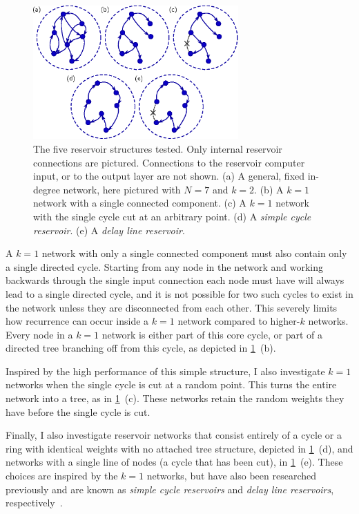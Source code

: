 \begin{figure}
  \includegraphics[width=0.7\textwidth]{figures/topology}
  \caption{The five reservoir structures tested. Only internal
    reservoir connections are pictured. Connections to the reservoir
    computer input, or to the output layer are not shown. (a) A
    general, fixed in-degree network, here pictured with $N=7$ and
    $k=2$. (b) A $k=1$ network with a single connected component. (c)
    A $k=1$ network with the single cycle cut at an arbitrary
    point. (d) A \emph{simple cycle reservoir}. (e) A \emph{delay line
      reservoir}.}%
  \label{fig:topology}
\end{figure}

A $k = 1$ network with only a single connected component must also
contain only a single directed cycle. Starting from any node in the
network and working backwards through the single input connection each
node must have will always lead to a single directed cycle, and it is
not possible for two such cycles to exist in the network unless they
are disconnected from each other. This severely limits how recurrence
can occur inside a $k = 1$ network compared to higher-$k$
networks. Every node in a $k = 1$ network is either part of this core
cycle, or part of a directed tree branching off from this cycle, as
depicted in \cref{fig:topology}~(b).

Inspired by the high performance of this simple structure, I also
investigate $k = 1$ networks when the single cycle is cut at a random
point. This turns the entire network into a tree, as in
\cref{fig:topology}~(c). These networks retain the random weights they
have before the single cycle is cut.

Finally, I also investigate reservoir networks that consist entirely
of a cycle or a ring with identical weights with no attached tree
structure, depicted in \cref{fig:topology}~(d), and networks with a
single line of nodes (a cycle that has been cut), in
\cref{fig:topology}~(e). These choices are inspired by the $k = 1$
networks, but have also been researched previously and are known as
\emph{simple cycle reservoirs} and \emph{delay line reservoirs},
respectively~\cite{rodan2011}.

